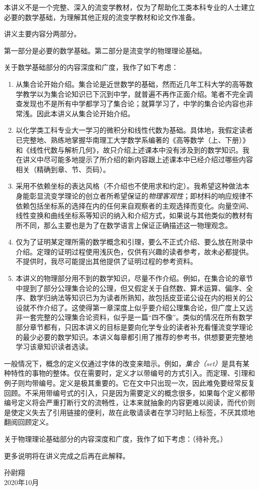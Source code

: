 \documentclass[main.tex]{subfiles}
\begin{document}
本讲义不是一个完整、深入的流变学教材，仅为了帮助化工类本科专业的人士建立必要的数学基础，为理解其他正规的流变学教材和论文作准备。

讲义主要内容分两部分。

第一部分是必要的数学基础。第二部分是流变学的物理理论基础。

关于数学基础部分的内容深度和广度，我作了如下考虑：
\begin{enumerate}
    \item 从集合论开始介绍。集合论是近世数学的基础，然而近几年工科大学的高等数学教学以为集合论知识已下沉到中学，就普遍不再作正面介绍。笔者不完全调查发现也不是所有中学都学习了集合论；就算学习了，中学的集合论内容也非常浅。因此本讲义从集合论开始介绍。
    \item 以化学类工科专业大一学习的微积分和线性代数为基础。具体地，我假定读者已完整地、熟练地掌握华南理工大学数学系编著的《高等数学（上、下册）》和《线性代数与解析几何》，故只介绍上述课本中没有涉及到的数学知识。我在讲义中尽可能多地提示了所介绍的新内容跟上述课本中已经介绍过哪些内容相关（精确到章、节、页码）。
    \item 采用不依赖坐标的表达风格（不介绍也不使用求和约定）。我希望这种做法本身能彰显流变学理论的创立者所希望保证的\emph{物理客观性}；即材料的响应规律不依赖包括坐标系的选择在内的任何来自观察者的主观选择而变化。向量空间、线性变换和曲线坐标系等知识的纳入和介绍方式，如果说与其他类似的教材有所不同，那么主要也是为了在数学语言上保证正确描述这一物理观念。
    \item 仅为了证明某定理所需的数学概念和引理，要么不正式介绍、要么放在附录中介绍。定理的证明过程使用浅灰色，仅供有兴趣的读者参考，故未必都提供。不提供时，我尽可能提出其他提供了证明过程的参考资料。
    \item 本讲义的物理部分用不到的数学知识，尽量不作介绍。例如，在集合论的章节中提到了部分公理集合论的公理，但又假定关于自然数、算术运算、偏序、全序、数学归纳法等知识已为为读者所熟知，故包括皮亚诺公设在内的相关的公设就不作介绍了。这使得第一章深度上似乎要介绍公理集合论，但广度上又远非一套完整的公理集合论资料，似乎是一篇“四不像”。类似的情况在所有数学部分章节都有，只因本讲义的目标是要向化学专业的读者补充看懂流变学理论的最少必要的数学知识。本讲义每章都引用了推荐的参考书，供想要更完整地学习该章知识读者选读。
\end{enumerate}

一般情况下，概念的定义仅通过字体的改变来暗示。例如，\emph{集合（set）}是具有某种特性的事物的整体。仅在需要时，定义才以带编号的方式引入。而定理、引理和例子则均带编号。定义是极其重要的。它在文中只出现一次，因此难免要经常反复回顾。不采用带编号式的引入，只是因为需要定义的概念很多，如果每个定义都带编号定义将会严重打断行文的流畅性，让本来就抽象的内容更难以阅读，而代价则是使定义失去了引用链接的便利，故在此敬请读者在学习时贴上标签，不厌其烦地翻阅回顾定义。

关于物理理论基础部分的内容深度和广度，我作了如下考虑：（待补充。）

更多说明将在讲义完成之后再在此解释。
\begin{flushright}
    孙尉翔\\
    2020年10月
\end{flushright}
\end{document}
